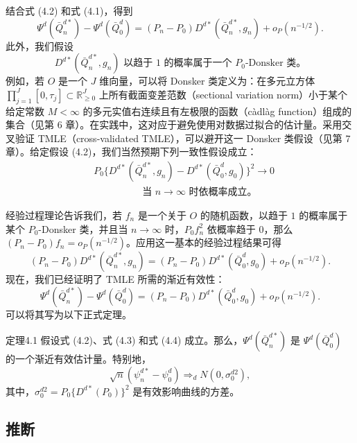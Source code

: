 结合式 (4.2) 和式 (4.1)，得到
\[
 \Psi^d(\bar Q_n^{d*})-\Psi^d(\bar Q_0^d)
 =(P_n-P_0)D^{d*}(\bar Q_n^{d*},g_n)+o_P(n^{-1/2}).
\]
此外，我们假设
\begin{equation}
 D^{d*}(\bar Q_n^{d*},g_n)
 \text{ 以趋于 }1\text{ 的概率属于一个 }P_0\text{-Donsker 类。}
 \tag{4.3}
\end{equation}
例如，若 $O$ 是一个 $J$ 维向量，可以将 Donsker 类定义为：在多元立方体
$\prod_{j=1}^J[0,\tau_j]\subset\mathbb R_{\geq0}^J$
上所有截面变差范数（sectional variation norm）小于某个给定常数 $M<\infty$ 的多元实值右连续且有左极限的函数（càdlàg function）组成的集合（见第 6 章）。在实践中，这对应于避免使用对数据过拟合的估计量。采用交叉验证 TMLE（cross-validated TMLE），可以避开这一 Donsker 类假设（见第 7 章）。给定假设 (4.2)，我们当然预期下列一致性假设成立：
\begin{equation}
 \begin{aligned}
 &P_0\bigl\{D^{d*}(\bar Q_n^{d*},g_n)
       -D^{d*}(\bar Q_0^d,g_0)\bigr\}^2\to0\\
 &\hspace{5em}\text{当 }n\to\infty\text{ 时依概率成立。}
 \end{aligned}
 \tag{4.4}
\end{equation}

经验过程理论告诉我们，若 $f_n$ 是一个关于 $O$ 的随机函数，以趋于 $1$ 的概率属于某个 $P_0$-Donsker 类，并且当 $n\to\infty$ 时，$P_0f_n^2$ 依概率趋于 $0$，那么 $(P_n-P_0)f_n=o_P(n^{-1/2})$。应用这一基本的经验过程结果可得
\[
 (P_n-P_0)D^{d*}(\bar Q_n^{d*},g_n)
 =(P_n-P_0)D^{d*}(\bar Q_0^d,g_0)+o_P(n^{-1/2}).
\]
现在，我们已经证明了 TMLE 所需的渐近有效性：
\begin{equation}
 \Psi^d(\bar Q_n^{d*})-\Psi^d(\bar Q_0^d)
 =(P_n-P_0)D^{d*}(\bar Q_0^d,g_0)+o_P(n^{-1/2}).
 \tag{4.5}
\end{equation}
可以将其写为以下正式定理。

\begin{bookresult}{定理}{4.1}
假设式 (4.2)、式 (4.3) 和式 (4.4) 成立。那么，$\Psi^d(\bar Q_n^{d*})$ 是 $\Psi^d(\bar Q_0^d)$ 的一个渐近有效估计量。特别地，
\[
 \sqrt n(\psi_n^{d*}-\psi_0^d)\Rightarrow_d N(0,\sigma_0^{d2}),
\]
其中，$\sigma_0^{d2}=P_0\{D^{d*}(P_0)\}^2$ 是有效影响曲线的方差。
\end{bookresult}

\subsection{推断}
\label{subsec:ch04-inference}

